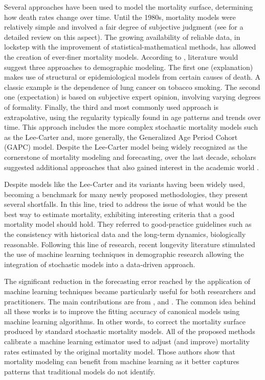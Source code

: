 \documentclass[fleqn,10pt]{wlscirep}
\begin{document}
Several approaches have been used to model the mortality surface, determining how death rates change over time. Until the 1980s, mortality models were relatively simple and involved a fair degree of subjective judgment (see \cite{Pollard} for a detailed review on this aspect). The growing availability of reliable data, in lockstep with the improvement of statistical-mathematical methods, has allowed the creation of ever-finer mortality models. According to \cite{Booth}, literature would suggest three approaches to demographic modeling. 
The first one (explanation) makes use of structural or epidemiological models from certain causes of death. A classic example is the dependence of lung cancer on tobacco smoking. The second one (expectation) is based on subjective expert opinion, involving varying degrees of formality. Finally, the third and most commonly used approach is extrapolative, using the regularity typically found in age patterns and trends over time.
This approach includes the more complex stochastic mortality models such as the Lee-Carter \cite{LC92} and, more generally, the Generalized Age Period Cohort (GAPC) model. Despite the Lee-Carter model being widely recognized as the cornerstone of mortality modeling and forecasting, over the last decade, scholars suggested additional approaches that also gained interest in the academic world \cite{BDV2002,RH,CBD06,CBD09}.

Despite models like the Lee-Carter and its variants having been widely used, becoming a benchmark for many newly proposed methodologies, they present several shortfalls. In this line, \cite{CBD08} tried to address the issue of what would be the best way to estimate mortality, exhibiting interesting criteria that a good mortality model should hold. They referred to good-practice guidelines such as the consistency with historical data and the long-term dynamics, biologically reasonable. Following this line of research, recent longevity literature stimulated the use of machine learning techniques in demographic research allowing the integration of stochastic models into a data-driven approach. 

The significant reduction in the forecasting error reached by the application of machine learning techniques became particularly useful for both researchers and practitioners. The main contributions are from \cite{Deprez}, \cite{LevPiz} and \cite{LevNi}. The common idea behind all these works is to improve the fitting accuracy of canonical models using machine learning algorithms. In other words, to correct the mortality surface produced by standard stochastic mortality models. All of the proposed methods calibrate a machine learning estimator used to adjust (and improve) mortality rates estimated by the original mortality model. Those authors show that mortality modeling can benefit from machine learning as it better captures patterns that traditional models do not identify. 
\end{document}
